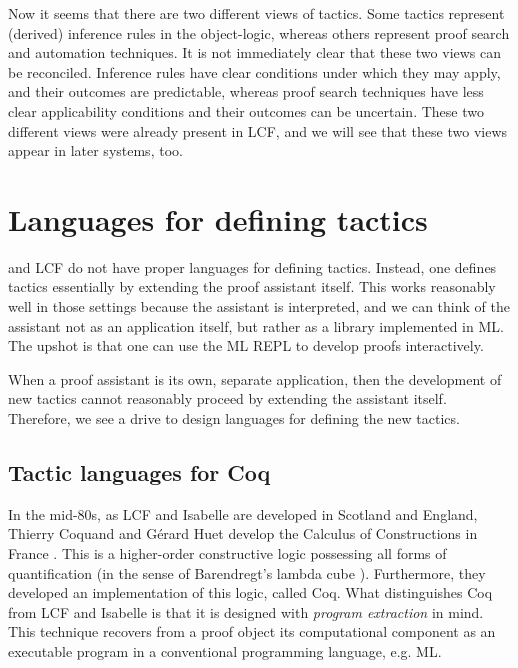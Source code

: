 Now it seems that there are two different views of tactics.
Some tactics represent (derived) inference rules in the object-logic, whereas
others represent proof search and automation techniques.
It is not immediately clear that these two views can be reconciled.
Inference rules have clear conditions under which they may apply, and their
outcomes are predictable, whereas proof search techniques have less clear
applicability conditions and their outcomes can be uncertain.
These two different views were already present in LCF, and we will see that
these two views appear in later systems, too.

%

\section{Languages for defining tactics}
\label{sec:defining-tactics}

\isb{} and LCF do not have proper languages for defining tactics.
Instead, one defines tactics essentially by extending the proof assistant
itself.
This works reasonably well in those settings because the assistant is
interpreted, and we can think of the assistant not as an application itself, but
rather as a library implemented in ML.
The upshot is that one can use the ML REPL to develop proofs interactively.

When a proof assistant is its own, separate application, then the development of
new tactics cannot reasonably proceed by extending the assistant itself.
Therefore, we see a drive to design languages for defining the new tactics.

\subsection{Tactic languages for Coq}

In the mid-80s, as LCF and Isabelle are developed in Scotland and England,
Thierry Coquand and Gérard Huet develop the Calculus of Constructions in France
\cite{coc}.
This is a higher-order constructive logic possessing all forms of quantification
(in the sense of Barendregt's lambda cube \cite{barendregt-lambda}).
Furthermore, they developed an implementation of this logic, called
Coq\footnotemark.
What distinguishes Coq from LCF and Isabelle is that it is designed with
\emph{program extraction} in mind.
This technique recovers from a proof object its computational component as an
executable program in a conventional programming language, e.g. ML.
%

